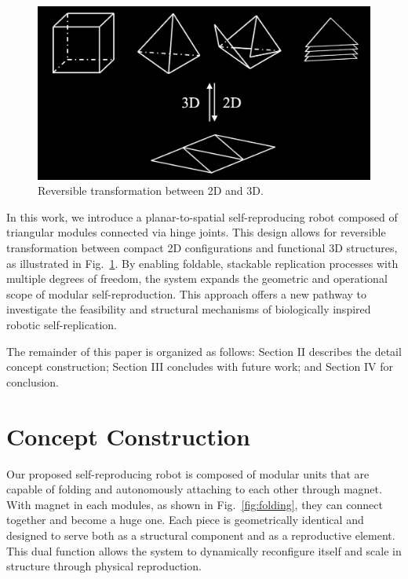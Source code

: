 \documentclass[lettersize,journal]{IEEEtran}
\begin{document}
\begin{figure}[H]
    \centering
    \includegraphics[width=0.85\linewidth]{transformation from 2d to 3d.png}
    \caption{Reversible transformation between 2D and 3D.}
    \label{fig:2d to 3d}
\end{figure}
In this work, we introduce a planar-to-spatial self-reproducing robot composed of triangular modules connected via hinge joints. This design allows for reversible transformation between compact 2D configurations and functional 3D structures, as illustrated in Fig.~\ref{fig:2d to 3d}. By enabling foldable, stackable replication processes with multiple degrees of freedom, the system expands the geometric and operational scope of modular self-reproduction. This approach offers a new pathway to investigate the feasibility and structural mechanisms of biologically inspired robotic self-replication.

The remainder of this paper is organized as follows: Section II describes the detail concept construction; Section III concludes with future work; and Section IV for conclusion.

\section{Concept Construction}
Our proposed self-reproducing robot is composed of modular units that are capable of folding and autonomously attaching to each other through magnet. With magnet in each modules, as shown in Fig.~\ref{fig:folding}, they can connect together and become a huge one. Each piece is geometrically identical and designed to serve both as a structural component and as a reproductive element. This dual function allows the system to dynamically reconfigure itself and scale in structure through physical reproduction.
\end{document}
